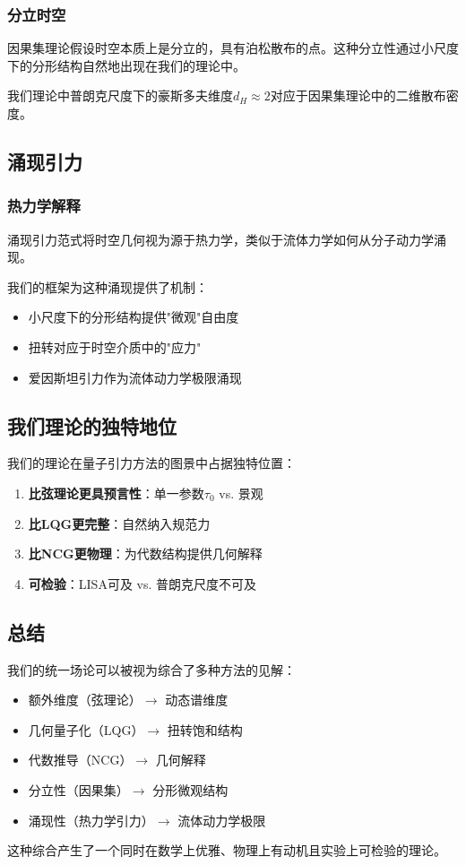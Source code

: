 \subsubsection{分立时空}

因果集理论假设时空本质上是分立的，具有泊松散布的点。这种分立性通过小尺度下的分形结构自然地出现在我们的理论中。

我们理论中普朗克尺度下的豪斯多夫维度$d_H \approx 2$对应于因果集理论中的二维散布密度。

\subsection{涌现引力}

\subsubsection{热力学解释}

涌现引力范式将时空几何视为源于热力学，类似于流体力学如何从分子动力学涌现。

我们的框架为这种涌现提供了机制：
\begin{itemize}
    \item 小尺度下的分形结构提供"微观"自由度
    \item 扭转对应于时空介质中的"应力"
    \item 爱因斯坦引力作为流体动力学极限涌现
\end{itemize}

\subsection{我们理论的独特地位}

我们的理论在量子引力方法的图景中占据独特位置：

\begin{enumerate}
    \item \textbf{比弦理论更具预言性}：单一参数$\tau_0$ vs. 景观
    \item \textbf{比LQG更完整}：自然纳入规范力
    \item \textbf{比NCG更物理}：为代数结构提供几何解释
    \item \textbf{可检验}：LISA可及 vs. 普朗克尺度不可及
\end{enumerate}

\subsection{总结}

我们的统一场论可以被视为综合了多种方法的见解：
\begin{itemize}
    \item 额外维度（弦理论）$\to$ 动态谱维度
    \item 几何量子化（LQG）$\to$ 扭转饱和结构
    \item 代数推导（NCG）$\to$ 几何解释
    \item 分立性（因果集）$\to$ 分形微观结构
    \item 涌现性（热力学引力）$\to$ 流体动力学极限
\end{itemize}

这种综合产生了一个同时在数学上优雅、物理上有动机且实验上可检验的理论。
